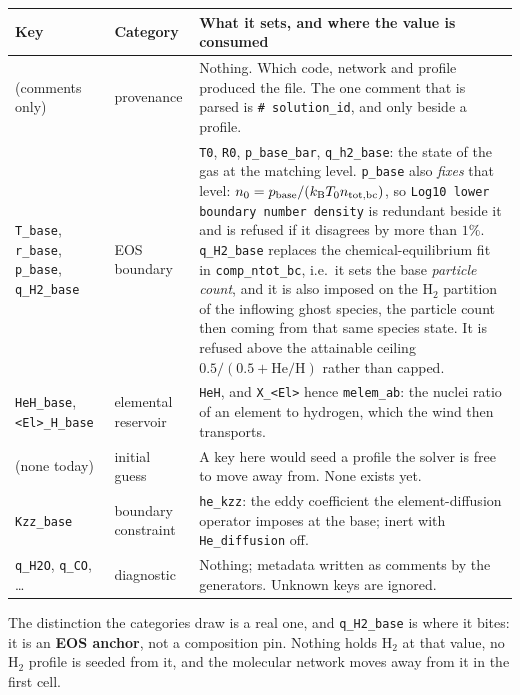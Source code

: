 \documentclass[english,a4paper]{my_memo}
\begin{document}
\begin{center}\small
\begin{tabular}{@{}>{\raggedright\arraybackslash}p{3.5cm}>{\raggedright\arraybackslash}p{2.6cm}>{\raggedright\arraybackslash}p{7.6cm}@{}}
\toprule
Key & Category & What it sets, and where the value is consumed \\
\midrule
(comments only) & provenance &
  Nothing. Which code, network and profile produced the file. The one comment
  that is parsed is \texttt{\# solution\_id}, and only beside a profile. \\
\texttt{T\_base}, \texttt{r\_base}, \texttt{p\_base},
\texttt{q\_H2\_base} & EOS boundary &
  \texttt{T0}, \texttt{R0}, \texttt{p\_base\_bar}, \texttt{q\_h2\_base}: the
  state of the gas at the matching level. \texttt{p\_base} also \emph{fixes}
  that level: $n_0 = p_{\rm base}/(k_{\rm B} T_0 n_{\rm tot,bc})$, so
  \texttt{Log10 lower boundary number density} is redundant beside it and is
  refused if it disagrees by more than $1\%$. \texttt{q\_H2\_base} replaces the
  chemical-equilibrium fit in \texttt{comp\_ntot\_bc}, i.e.\ it sets the base
  \emph{particle count}, and it is also imposed on the H$_2$ partition of the
  inflowing ghost species, the particle count then coming from that same
  species state. It is refused above the attainable ceiling
  $0.5/(0.5+\mathrm{He/H})$ rather than capped. \\
\texttt{HeH\_base},
\texttt{<El>\_H\_base} & elemental reservoir &
  \texttt{HeH}, and \texttt{X\_<El>} hence \texttt{melem\_ab}: the nuclei ratio
  of an element to hydrogen, which the wind then transports. \\
(none today) & initial guess &
  A key here would seed a profile the solver is free to move away from. None
  exists yet. \\
\texttt{Kzz\_base} & boundary constraint &
  \texttt{he\_kzz}: the eddy coefficient the element-diffusion operator imposes
  at the base; inert with \texttt{He\_diffusion} off. \\
\texttt{q\_H2O}, \texttt{q\_CO}, \ldots & diagnostic &
  Nothing; metadata written as comments by the generators. Unknown keys are
  ignored. \\
\bottomrule
\end{tabular}
\end{center}

The distinction the categories draw is a real one, and \texttt{q\_H2\_base} is
where it bites: it is an \textbf{EOS anchor}, not a composition pin. Nothing
holds H$_2$ at that value, no H$_2$ profile is seeded from it, and the
molecular network moves away from it in the first cell.
\end{document}
